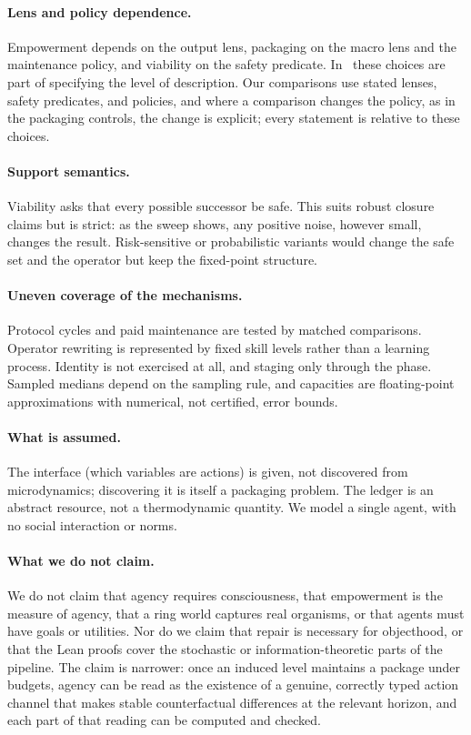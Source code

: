 \paragraph{Lens and policy dependence.}
Empowerment depends on the output lens, packaging on the macro lens and the maintenance policy, and viability on the safety predicate. In \SBT\ these choices are part of specifying the level of description. Our comparisons use stated lenses, safety predicates, and policies, and where a comparison changes the policy, as in the packaging controls, the change is explicit; every statement is relative to these choices.

\paragraph{Support semantics.}
Viability asks that every possible successor be safe. This suits robust closure claims but is strict: as the sweep shows, any positive noise, however small, changes the result. Risk-sensitive or probabilistic variants would change the safe set and the operator but keep the fixed-point structure.

\paragraph{Uneven coverage of the mechanisms.}
Protocol cycles and paid maintenance are tested by matched comparisons. Operator rewriting is represented by fixed skill levels rather than a learning process. Identity is not exercised at all, and staging only through the phase. Sampled medians depend on the sampling rule, and capacities are floating-point approximations with numerical, not certified, error bounds.

\paragraph{What is assumed.}
The interface (which variables are actions) is given, not discovered from microdynamics; discovering it is itself a packaging problem. The ledger is an abstract resource, not a thermodynamic quantity. We model a single agent, with no social interaction or norms.

\paragraph{What we do not claim.}
We do not claim that agency requires consciousness, that empowerment is the measure of agency, that a ring world captures real organisms, or that agents must have goals or utilities. Nor do we claim that repair is necessary for objecthood, or that the Lean proofs cover the stochastic or information-theoretic parts of the pipeline. The claim is narrower: once an induced level maintains a package under budgets, agency can be read as the existence of a genuine, correctly typed action channel that makes stable counterfactual differences at the relevant horizon, and each part of that reading can be computed and checked.

